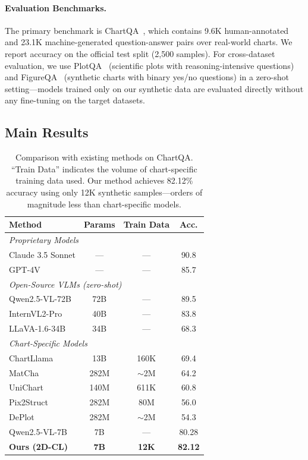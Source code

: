 \documentclass[journal]{IEEEtran}
\newcommand{\method}{2D-CL}
\begin{document}
\paragraph{Evaluation Benchmarks.}
The primary benchmark is ChartQA~\cite{masry2022chartqa}, which contains 9.6K human-annotated and 23.1K machine-generated question-answer pairs over real-world charts. We report accuracy on the official test split (2,500 samples). For cross-dataset evaluation, we use PlotQA~\cite{methani2020plotqa} (scientific plots with reasoning-intensive questions) and FigureQA~\cite{kahou2017figureqa} (synthetic charts with binary yes/no questions) in a zero-shot setting---models trained only on our synthetic data are evaluated directly without any fine-tuning on the target datasets.

\subsection{Main Results}
\label{sec:main_results}
\begin{table}[!t]
\centering
\small
\begin{tabular}{lccc}
\toprule
\textbf{Method} & \textbf{Params} & \textbf{Train Data} & \textbf{Acc.} \\
\midrule
\multicolumn{4}{l}{\textit{Proprietary Models}} \\
Claude 3.5 Sonnet & --- & --- & 90.8 \\
GPT-4V & --- & --- & 85.7 \\
\midrule
\multicolumn{4}{l}{\textit{Open-Source VLMs (zero-shot)}} \\
Qwen2.5-VL-72B & 72B & --- & 89.5 \\
InternVL2-Pro & 40B & --- & 83.8 \\
LLaVA-1.6-34B & 34B & --- & 68.3 \\
\midrule
\multicolumn{4}{l}{\textit{Chart-Specific Models}} \\
ChartLlama & 13B & 160K & 69.4 \\
MatCha & 282M & $\sim$2M & 64.2 \\
UniChart & 140M & 611K & 60.8 \\
Pix2Struct & 282M & 80M & 56.0 \\
DePlot & 282M & $\sim$2M & 54.3 \\
\midrule
Qwen2.5-VL-7B & 7B & --- & 80.28 \\
\textbf{Ours (\method{})} & \textbf{7B} & \textbf{12K} & \textbf{82.12} \\
\bottomrule
\end{tabular}
\caption{Comparison with existing methods on ChartQA. ``Train Data'' indicates the volume of chart-specific training data used. Our method achieves 82.12\% accuracy using only 12K synthetic samples---orders of magnitude less than chart-specific models.}
\label{tab:sota}
\end{table}
\end{document}
